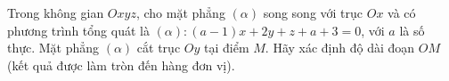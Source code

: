 \begin{ex}
Trong không gian $Oxyz$, cho mặt phẳng $(\alpha)$ song song với trục $Ox$ và có phương trình tổng quát là $(\alpha)\colon(a-1)x+2y+z+a+3=0$, với $a$ là số thực. Mặt phẳng $(\alpha)$ cắt trục $Oy$ tại điểm $M$. Hãy xác định độ dài đoạn $OM$ (kết quả được làm tròn đến hàng đơn vị).
\end{ex}
